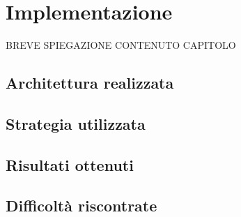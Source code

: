 \chapter{Implementazione} %
%

\begin{citazione}
BREVE SPIEGAZIONE CONTENUTO CAPITOLO
\end{citazione}

\section{Architettura realizzata}

\section{Strategia utilizzata}

\section{Risultati ottenuti}

\section{Difficoltà riscontrate}


\newpage
